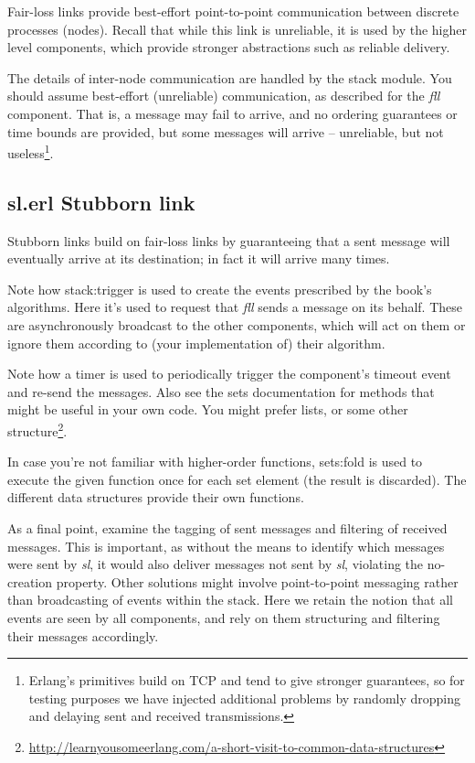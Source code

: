 \documentclass[a4paper]{article}
\begin{document}
Fair-loss links provide best-effort point-to-point communication between
discrete processes (nodes). Recall that while this link is unreliable, it is
used by the higher level components, which provide stronger abstractions such
as reliable delivery.

The details of inter-node communication are handled by the stack module. You
should assume best-effort (unreliable) communication, as described for the
\emph{fll} component. That is, a message may fail to arrive, and no ordering
guarantees or time bounds are provided, but some messages will arrive --
unreliable, but not useless\footnote{Erlang's primitives build on TCP and tend
to give stronger guarantees, so for testing purposes we have injected
additional problems by randomly dropping and delaying sent and received
transmissions.}.


\subsection{sl.erl Stubborn link} %
\label{ssub:sl_erl_stubborn_link}

Stubborn links build on fair-loss links by guaranteeing that a sent message
will eventually arrive at its destination; in fact it will arrive many times.

Note how stack:trigger is used to create the events prescribed by the book's
algorithms. Here it's used to request that \emph{fll} sends a message on its
behalf. These are asynchronously broadcast to the other components, which will
act on them or ignore them according to (your implementation of) their
algorithm.

Note how a timer is used to periodically trigger the component's timeout event
and re-send the messages. Also see the sets documentation for methods that
might be useful in your own code. You might prefer lists, or some other
structure\footnote{\url{http://learnyousomeerlang.com/a-short-visit-to-common-data-structures}}.

In case you're not familiar with higher-order functions, sets:fold is used to
execute the given function once for each set element (the result is
discarded). The different data structures provide their own functions.

As a final point, examine the tagging of sent messages and filtering of
received messages. This is important, as without the means to identify which
messages were sent by \emph{sl}, it would also deliver messages not sent by \emph{sl},
violating the no-creation property. Other solutions might involve
point-to-point messaging rather than broadcasting of events within the stack.
Here we retain the notion that all events are seen by all components, and
rely on them structuring and filtering their messages accordingly.
\end{document}
